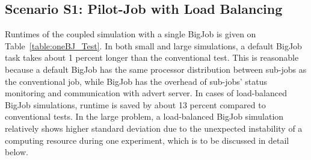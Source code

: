\documentclass[conference,final]{IEEEtran}
\newcommand{\jhanote}[1]{ {\textcolor{red} { ***Jha: #1 }}}
\newcommand{\jhanote}[1]{}
\begin{document}
\subsection{Scenario S1: Pilot-Job with Load Balancing}


Runtimes of the coupled simulation with a single BigJob is given on Table~\ref{table:oneBJ_Test}. In both small and large simulations, a default BigJob task takes about 1 percent longer than the conventional test. This is reasonable because a default BigJob has the same processor distribution between sub-jobs as the conventional job, while BigJob has the overhead of sub-jobs' status monitoring and communication with advert server. In cases of load-balanced BigJob simulations, runtime is saved by about 13 percent compared to conventional tests. In the large problem, a load-balanced BigJob simulation relatively shows higher standard deviation due to the unexpected instability of a computing resource during one experiment, which is to be discussed in detail below.
\end{document}
